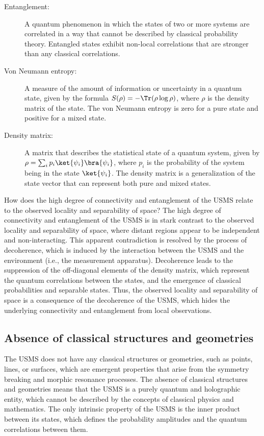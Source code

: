 \begin{tcolorbox}[colback=blue!5!white,colframe=blue!75!black,title=New terms]
    \begin{description}
        \item[Entanglement:] A quantum phenomenon in which the states of two or more systems are correlated in a way that cannot be described by classical probability theory. Entangled states exhibit non-local correlations that are stronger than any classical correlations.
        \item[Von Neumann entropy:] A measure of the amount of information or uncertainty in a quantum state, given by the formula $S(\rho) = -\Tr(\rho \log \rho)$, where $\rho$ is the density matrix of the state. The von Neumann entropy is zero for a pure state and positive for a mixed state.
        \item[Density matrix:] A matrix that describes the statistical state of a quantum system, given by $\rho = \sum_i p_i \ket{\psi_i}\bra{\psi_i}$, where $p_i$ is the probability of the system being in the state $\ket{\psi_i}$. The density matrix is a generalization of the state vector that can represent both pure and mixed states.
    \end{description}
\end{tcolorbox}

\begin{tcolorbox}[colback=green!5!white,colframe=green!75!black,title=Question]
    How does the high degree of connectivity and entanglement of the USMS relate to the observed locality and separability of space?
    \tcblower
    The high degree of connectivity and entanglement of the USMS is in stark contrast to the observed locality and separability of space, where distant regions appear to be independent and non-interacting. This apparent contradiction is resolved by the process of decoherence, which is induced by the interaction between the USMS and the environment (i.e., the measurement apparatus). Decoherence leads to the suppression of the off-diagonal elements of the density matrix, which represent the quantum correlations between the states, and the emergence of classical probabilities and separable states. Thus, the observed locality and separability of space is a consequence of the decoherence of the USMS, which hides the underlying connectivity and entanglement from local observations.
\end{tcolorbox}

\subsection{Absence of classical structures and geometries}
The USMS does not have any classical structures or geometries, such as points, lines, or surfaces, which are emergent properties that arise from the symmetry breaking and morphic resonance processes. The absence of classical structures and geometries means that the USMS is a purely quantum and holographic entity, which cannot be described by the concepts of classical physics and mathematics. The only intrinsic property of the USMS is the inner product between its states, which defines the probability amplitudes and the quantum correlations between them.

